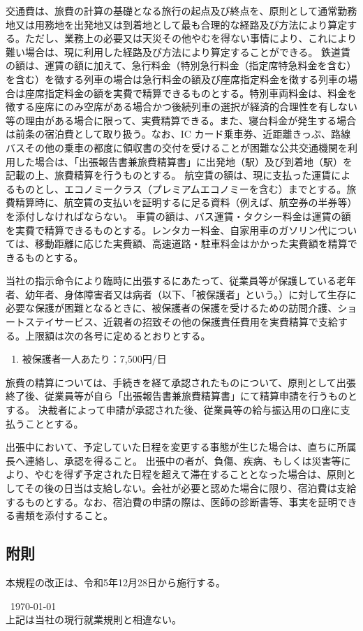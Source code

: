 \documentclass[10pt,a4paper,uplatex]{jsarticle}
\begin{document}
交通費は、旅費の計算の基礎となる旅行の起点及び終点を、原則として通常勤務地又は用務地を出発地又は到着地として最も合理的な経路及び方法により算定する。ただし、業務上の必要又は天災その他やむを得ない事情により、これにより難い場合は、現に利用した経路及び方法により算定することができる。
\term 鉄道賃の額は、運賃の額に加えて、急行料金（特別急行料金（指定席特急料金を含む）を含む）を徴する列車の場合は急行料金の額及び座席指定料金を徴する列車の場合は座席指定料金の額を実費で精算できるものとする。特別車両料金は、料金を徴する座席にのみ空席がある場合かつ後続列車の選択が経済的合理性を有しない等の理由がある場合に限って、実費精算できる。また、寝台料金が発生する場合は前条の宿泊費として取り扱う。なお、IC カード乗車券、近距離きっぷ、路線バスその他の乗車の都度に領収書の交付を受けることが困難な公共交通機関を利用した場合は、「出張報告書兼旅費精算書」に出発地（駅）及び到着地（駅）を記載の上、旅費精算を行うものとする。
\term 航空賃の額は、現に支払った運賃によるものとし、エコノミークラス（プレミアムエコノミーを含む）までとする。旅費精算時に、航空賃の支払いを証明するに足る資料（例えば、航空券の半券等）を添付しなければならない。
\term 車賃の額は、バス運賃・タクシー料金は運賃の額を実費で精算できるものとする。レンタカー料金、自家用車のガソリン代については、移動距離に応じた実費額、高速道路・駐車料金はかかった実費額を精算できるものとする。

当社の指示命令により臨時に出張するにあたって、従業員等が保護している老年者、幼年者、身体障害者又は病者（以下、「被保護者」という。）に対して生存に必要な保護が困難となるときに、被保護者の保護を受けるための訪問介護、ショートステイサービス、近親者の招致その他の保護責任費用を実費精算で支給する。上限額は次の各号に定めるとおりとする。
\begin{enumerate}
    \item 被保護者一人あたり：7,500円/日
\end{enumerate}

旅費の精算については、手続きを経て承認されたものについて、原則として出張終了後、従業員等が自ら「出張報告書兼旅費精算書」にて精算申請を行うものとする。
\term 決裁者によって申請が承認された後、従業員等の給与振込用の口座に支払うこととする。

出張中において、予定していた日程を変更する事態が生じた場合は、直ちに所属長へ連絡し、承認を得ること。
\term 出張中の者が、負傷、疾病、もしくは災害等により、やむを得ず予定された日程を超えて滞在することとなった場合は、原則としてその後の日当は支給しない。会社が必要と認めた場合に限り、宿泊費は支給するものとする。なお、宿泊費の申請の際は、医師の診断書等、事実を証明できる書類を添付すること。

\subsection*{附則}
本規程の改正は、令和5年12月28日から施行する。

\begin{flushleft}\
\today\\
\vspace{10pt}
上記は当社の現行就業規則と相違ない。\\
\vspace{10pt}
\MakeSignatureField
\end{flushleft}
\end{document}
